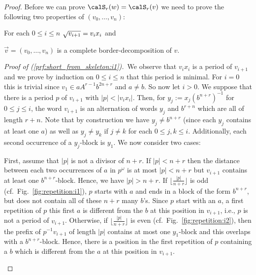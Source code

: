 \begin{proof}
	Before we can prove $\calS_r(w)=\calS_r(v)$ we need to prove the following two properties of $(v_0,\dots,v_n)$:
	\begin{alphaenumerate}
		\item For each $0\leq i\leq n$ $\sqrt{v_{i+1}}=v_ix_i$ and\label{prf:short_from_skeleton:i1}
		\item $\vec{v}=(v_0,\dots,v_{n})$ is a complete border-decomposition of $v$.\label{prf:short_from_skeleton:i2}
	\end{alphaenumerate}
	\emph{Proof of (\ref{prf:short_from_skeleton:i1}).}\ We observe that $v_ix_i$ is a period of $v_{i+1}$ and we prove by induction on $0\leq i\leq n$ that this period is minimal. For $i=0$ this is trivial since $v_1\in aA^{r-1}b^{2n+r}$ and $a\neq b$. So now let $i>0$. We suppose that there is a period $p$ of $v_{i+1}$ with $|p|<|v_ix_i|$. Then, for $y_j:=x_j(b^{n+r})^{-1}$ for $0\leq j\leq i$, the word $v_{i+1}$ is an alternation of words $y_j$ and $b^{r+n}$ which are all of length $r+n$. Note that by construction we have $y_{j}\neq b^{n+r}$ (since each $y_{j}$ contains at least one $a$) as well as $y_{j}\neq y_{k}$ if $j\neq k$ for each $0\leq j,k\leq i$. Additionally, each second occurrence of a $y_j$-block is $y_1$. We now consider two cases:
	
	First, assume that $|p|$ is not a divisor of $n+r$. If $|p|<n+r$ then the distance between each two occurrences of $a$ in $p^\omega$ is at most $|p|<n+r$ but $v_{i+1}$ contains at least one $b^{n+r}$-block. Hence, we have $|p|>n+r$. If $\lfloor\frac{|p|}{n+r}\rfloor$ is odd (cf.\ Fig.~\ref{fig:repetition:i1}), $p$ starts with $a$ and ends in a block of the form $b^{n+r}$, but does not contain all of these $n+r$ many $b$'s. Since $p$ start with an $a$, a first repetition of $p$ this first $a$ is different from the $b$ at this position in $v_{i+1}$, i.e., $p$ is not a period of $v_{i+1}$. Otherwise, if $\lfloor\frac{|p|}{n+r}\rfloor$ is even (cf.\ Fig.~\ref{fig:repetition:i2}), then the prefix of $p^{-1}v_{i+1}$ of length $|p|$ contains at most one $y_1$-block and this overlaps with a $b^{n+r}$-block. Hence, there is a position in the first repetition of $p$ containing a $b$ which is different from the $a$ at this position in $v_{i+1}$.
	
	\begin{figure}[h]
		\begin{subfigure}{\textwidth}
			
		\end{subfigure}
		\begin{subfigure}{\textwidth}
			
		\end{subfigure}
		\caption{\label{fig:repetition}}
	\end{figure}
	

\end{proof}
